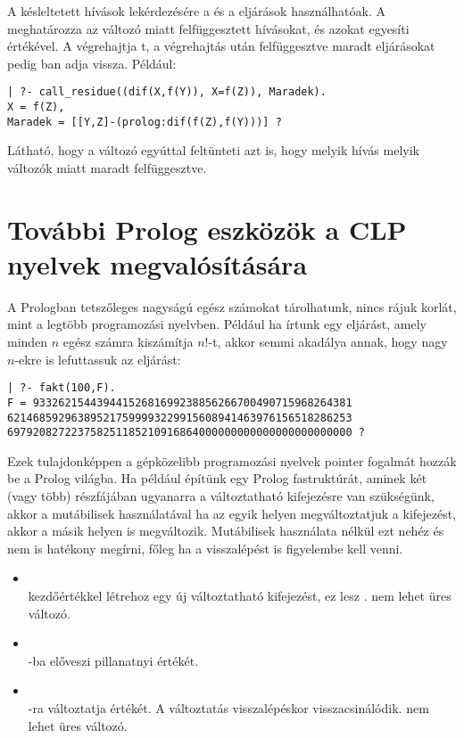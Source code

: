 A késleltetett hívások lekérdezésére a  és a 
eljárások használhatóak. A  meghatározza az 
változó miatt felfüggesztett hívásokat, és azokat egyesíti 
értékével. A  végrehajtja t, a
végrehajtás után felfüggesztve maradt eljárásokat pedig ban adja
vissza. Például:

\begin{verbatim}
| ?- call_residue((dif(X,f(Y)), X=f(Z)), Maradek).
X = f(Z),
Maradek = [[Y,Z]-(prolog:dif(f(Z),f(Y)))] ?
\end{verbatim}

Látható, hogy a  változó egyúttal feltünteti azt is, hogy melyik
hívás melyik változók miatt maradt felfüggesztve.

\section{További Prolog eszközök a CLP nyelvek megvalósítására}

A Prologban tetszőleges nagyságú egész számokat tárolhatunk, nincs rájuk
korlát, mint a legtöbb programozási nyelvben. Például ha írtunk egy
 eljárást, amely minden $n$ egész számra kiszámítja $n!$-t, akkor
semmi akadálya annak, hogy nagy $n$-ekre is lefuttassuk az eljárást:

\begin{verbatim}
| ?- fakt(100,F).
F = 93326215443944152681699238856266700490715968264381
621468592963895217599993229915608941463976156518286253
697920827223758251185210916864000000000000000000000000 ? 
\end{verbatim}


Ezek tulajdonképpen a gépközelibb programozási nyelvek pointer
fogalmát hozzák be a Prolog világba. Ha például építünk egy
Prolog fastruktúrát, aminek két (vagy több) részfájában
ugyanarra a változtatható kifejezésre van szükségünk, akkor a
mutábilisek használatával ha az egyik helyen megváltoztatjuk a
kifejezést, akkor a másik helyen is megváltozik. Mutábilisek
használata nélkül ezt nehéz és nem is hatékony megírni, főleg
ha a visszalépést is figyelembe kell venni.

\begin{itemize}
\item {} \\
 kezdőértékkel létrehoz egy új változtatható kifejezést,
ez lesz .  nem lehet üres változó.

\item {} \\
-ba előveszi  pillanatnyi értékét.

\item {} \\
-ra változtatja  értékét. A változtatás visszalépéskor
visszacsinálódik.  nem lehet üres változó.
\end{itemize}

